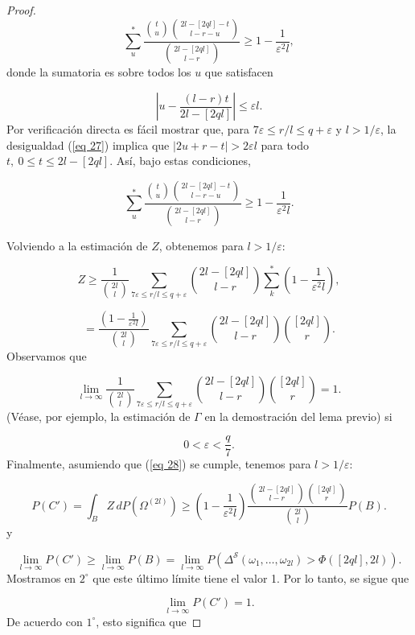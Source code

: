 \documentclass{report}
\begin{document}
\begin{proof}
\[
\sum_u^* \frac{\binom{t}{u} \binom{2l - [2q l] - t}{l - r - u}}{\binom{2l - [2q l]}{l - r}} \geq 1 - \frac{1}{\varepsilon^2 l},
\]
donde la sumatoria es sobre todos los \( u \) que satisfacen

\begin{equation}\label{eq 27}
    \left| u - \frac{(l - r) t}{2l - [2q l]} \right| \leq \varepsilon l.
\end{equation}
Por verificación directa es fácil mostrar que, para \( 7 \varepsilon \leq r/l \leq q + \varepsilon \) y \( l > 1/\varepsilon \),
la desigualdad (\ref{eq 27}) implica que \( |2u + r - t| > 2 \varepsilon l \) para todo \( t, \ 0 \leq t \leq 2l - [2q l] \).
Así, bajo estas condiciones,

\[
\sum_u^* \frac{\binom{t}{u} \binom{2l - [2q l] - t}{l - r - u}}{\binom{2l - [2q l]}{l - r}} \geq 1 - \frac{1}{\varepsilon^2 l}.
\]

Volviendo a la estimación de \( Z \), obtenemos para \( l > 1/\varepsilon \):

\[
Z \geq \frac{1}{\binom{2l}{l}} \sum_{7 \varepsilon \leq r/l \leq q + \varepsilon} \binom{2l - [2q l]}{l - r} \sum_k^* \left( 1 - \frac{1}{\varepsilon^2 l} \right),
\]

\[
= \frac{\left( 1 - \frac{1}{\varepsilon^2 l} \right)}{\binom{2l}{l}} \sum_{7 \varepsilon \leq r/l \leq q + \varepsilon} \binom{2l - [2q l]}{l - r} \binom{[2q l]}{r}.
\]
Observamos que

\[
\lim_{l \to \infty} \frac{1}{\binom{2l}{l}} \sum_{7 \varepsilon \leq r/l \leq q + \varepsilon} \binom{2l - [2q l]}{l - r} \binom{[2q l]}{r} = 1.
\]
(Véase, por ejemplo, la estimación de \( \Gamma \) en la demostración del lema previo) si

\begin{equation}\label{eq 28}
0 < \varepsilon < \frac{q}{7}.
\end{equation}
Finalmente, asumiendo que (\ref{eq 28}) se cumple, tenemos para \( l > 1/\varepsilon \):

\[
P(C') = \int_B Z \, dP(\Omega^{(2l)}) \geq \left( 1 - \frac{1}{\varepsilon^2 l} \right) \frac{\binom{2l - [2q l]}{l - r} \binom{[2q l]}{r}}{\binom{2l}{l}} P(B).
\]
y

\[
\lim_{l \to \infty} P(C') \geq \lim_{l \to \infty} P(B) = \lim_{l \to \infty} P(\Delta^{\mathcal{S}}(\omega_1, \dots, \omega_{2l}) > \Phi([2q l],2l)).
\]
Mostramos en \( 2^\circ \) que este último límite tiene el valor 1. Por lo tanto, se sigue que

\[
\lim_{l \to \infty} P(C') = 1.
\]
De acuerdo con \( 1^\circ \), esto significa que


\end{proof}
\end{document}
